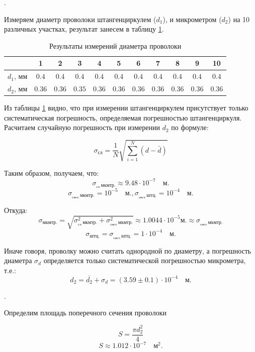 \documentclass[a4paper, 12pt]{article}
\newcounter{Points}
\newcommand{\point}{\arabic{Points}. \addtocounter{Points}{1}}
\begin{document}
\point Измеряем диаметр проволоки штангенциркулем ($d_1$), и микрометром ($d_2$) на 10 различных участках, результат занесем в таблицу \ref{tabl:diam}.

\begin{table}[h!]
    \centering
    \begin{tabular}{|c|c|c|c|c|c|c|c|c|c|c|}
        \hline
        & \textbf{1} & \textbf{2} & \textbf{3} & \textbf{4} & \textbf{5} &   \textbf{6} & \textbf{7} & \textbf{8} & \textbf{9} & \textbf{10} \\ \hline
        $d_1$, мм & $0.4$& $0.4$& $0.4$ & $0.4$& $0.4$ &$0.4$ & $0.4$ & $0.4$ & $0.4$ & $0.4$\\ \hline
        $d_2$, мм & $0.36$ & $0.36$ & $0.35$ & $0.36$& $0.36$ &$0.36$ & $0.36$ & $0.36$ & $0.36$ & $0.36$\\ \hline

    \end{tabular}
    \caption{Результаты измерений диаметра проволоки}
    \label{tabl:diam}
    \end{table}

Из таблицы \ref{tabl:diam} видно, что при измерении штангенциркулем присутствует только систематическая погрешность, определяемая погрешностью штангенциркуля.
Расчитаем случайную погрешность при измерении $d_2$ по формуле:

\begin{equation} \label{eq:4}
    \sigma_{сл} = \frac{1}{N} \sqrt{\sum_{i = 1}^{N} (d - \bar{d})}
\end{equation}

Таким образом, получаем, что:
\[
    \sigma_{_{сл.} мкмтр.} \approx 9.48 \cdot 10^{-7} \quad \text{м.}
\]
\[
    \sigma_{_{сист.}  мкмтр.} = 10^{-5} \quad \text{м.}, \sigma_{_{сист.} штц.} = 10^{-4} \quad  \text{м.}
\]

Откуда:
\[
    \sigma_{мкмтр.} = \sqrt{\sigma_{_{сл.} мкмтр.}^2 + \sigma_{_{сист.}  мкмтр.}^2} \approx 1.0044 \cdot 10^{-5} \text{м.} \approx  \sigma_{_{сист.}  мкмтр.}
\]
\[
    \sigma_{штц.} = \sigma_{_{сист.}  штц.} = 1 \cdot 10^{-4} \quad \text{м.}
\]

Иначе говоря, проволку можно считать однородной по диаметру, а погрешность диаметра $\sigma_d$ определяется только систематической погрешностью микрометра, т.е.:
\[
    d_2 = \bar{d_2} + \sigma_d = (3.59 \pm 0.1) \cdot 10^{-4} \quad \text{м.}
\]

\point Определим площадь поперечного сечения проволоки

\[
    S = \frac{\pi d_2^2}{4}
\]
\[
    S \approx 1.012 \cdot 10^{-7} \quad  \text{м}^2.
\]
\end{document}
